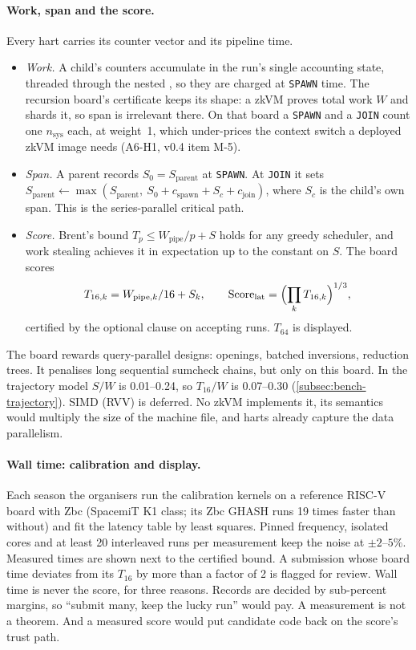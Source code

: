 \paragraph{Work, span and the score.} Every hart carries its counter vector and its pipeline time.
\begin{itemize}[nosep]
\item \emph{Work.} A child's counters accumulate in the run's single accounting state, threaded
  through the nested , so they are charged at \texttt{SPAWN} time. The recursion board's
  certificate keeps its shape: a zkVM proves total work $W$ and shards it, so span is irrelevant there.
  On that board a \texttt{SPAWN} and a \texttt{JOIN} count one $n_{\mathrm{sys}}$ each, at weight~1,
  which under-prices the context switch a deployed zkVM image needs (A6-H1, v0.4 item M-5).
\item \emph{Span.} A parent records $S_0=S_{\mathrm{parent}}$ at \texttt{SPAWN}. At \texttt{JOIN} it
  sets $S_{\mathrm{parent}}\leftarrow\max(S_{\mathrm{parent}},\ S_0+c_{\mathrm{spawn}}+S_c+c_{\mathrm{join}})$,
  where $S_c$ is the child's own span. This is the series-parallel critical path.
\item \emph{Score.} Brent's bound $T_p\le W_{\mathrm{pipe}}/p+S$ holds for any greedy scheduler, and
  work stealing achieves it in expectation up to the constant on $S$. The board scores
\[
  T_{16,k}=W_{\mathrm{pipe},k}/16+S_k,\qquad \mathrm{Score}_{\mathrm{lat}}=\Bigl(\prod_kT_{16,k}\Bigr)^{1/3},
\]
  certified by the optional clause  on accepting runs. $T_{64}$ is
  displayed.
\end{itemize}
The board rewards query-parallel designs: openings, batched inversions, reduction trees. It penalises
long sequential sumcheck chains, but only on this board. In the trajectory model $S/W$ is 0.01--0.24,
so $T_{16}/W$ is 0.07--0.30 (\cref{subsec:bench-trajectory}). SIMD (RVV) is deferred. No zkVM
implements it, its semantics would multiply the size of the machine file, and harts already capture
the data parallelism.

\paragraph{Wall time: calibration and display.} Each season the organisers run the calibration kernels
on a reference RISC-V board with Zbc (SpacemiT K1 class; its Zbc GHASH runs 19 times faster than
without) and fit the latency table by least squares. Pinned frequency, isolated cores and at least 20
interleaved runs per measurement keep the noise at $\pm2$--$5\%$. Measured times are shown next to the
certified bound. A submission whose board time deviates from its $T_{16}$ by more than a factor of 2 is
flagged for review. Wall time is never the score, for three reasons. Records are decided by sub-percent
margins, so \enquote{submit many, keep the lucky run} would pay. A measurement is not a theorem. And a
measured score would put candidate code back on the score's trust path.

